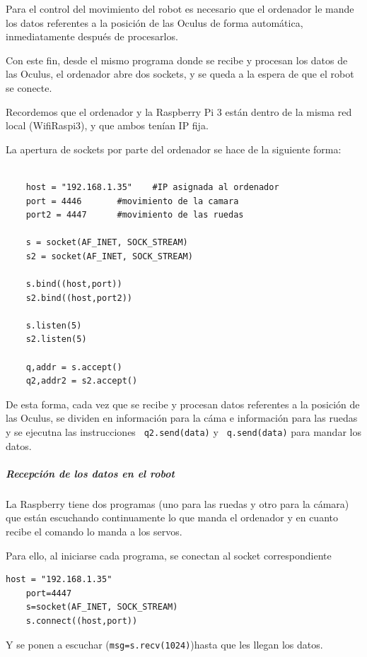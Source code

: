 \documentclass[twoside, 12pt]{epstfg}
\begin{document}
Para el control del movimiento del robot es necesario que el ordenador le mande los datos referentes a la posición de las Oculus de forma automática, inmediatamente después de procesarlos.

Con este fin, desde el mismo programa donde se recibe y procesan los datos de las Oculus, el ordenador abre dos sockets, y se queda a la espera de que el robot se conecte.

Recordemos que el ordenador y la Raspberry Pi 3 están dentro de la misma red local (WifiRaspi3), y que ambos tenían IP fija.

La apertura de sockets por parte del ordenador se hace de la siguiente forma:

\lstset{language=python, breaklines=true, basicstyle=\footnotesize}
\begin{lstlisting}[frame=single]

	host = "192.168.1.35"    #IP asignada al ordenador
	port = 4446       #movimiento de la camara
	port2 = 4447      #movimiento de las ruedas

	s = socket(AF_INET, SOCK_STREAM)
	s2 = socket(AF_INET, SOCK_STREAM)

	s.bind((host,port))
	s2.bind((host,port2))

	s.listen(5)
	s2.listen(5)

	q,addr = s.accept()
	q2,addr2 = s2.accept()

\end{lstlisting}

De esta forma, cada vez que se recibe y procesan datos referentes a la posición de las Oculus, se dividen en información para la cáma e información para las ruedas y se ejecutna las instrucciones \texttt{ q2.send(data)}  y \texttt{ q.send(data)} para mandar los datos.
\subparagraph{Recepción de los datos en el robot}

La Raspberry tiene dos programas (uno para las ruedas y otro para la
cámara) que están escuchando continuamente lo que manda el ordenador y en
cuanto recibe el comando lo manda a los servos.

Para ello, al iniciarse cada programa, se conectan al socket correspondiente
\lstset{language=python, breaklines=true, basicstyle=\footnotesize}
\begin{lstlisting}[frame=single]
	host = "192.168.1.35"
	port=4447
	s=socket(AF_INET, SOCK_STREAM)
	s.connect((host,port))
\end{lstlisting}

Y se ponen a escuchar (\texttt{msg=s.recv(1024)})hasta que les llegan los datos.
\end{document}

